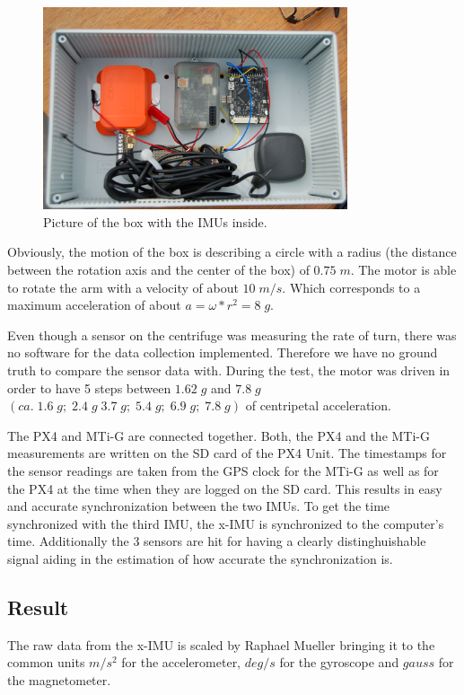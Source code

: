 \begin{figure}[hb]
\begin{center}
\includegraphics[width=0.8\textwidth]{pictures/box.JPG}
\caption{Picture of the box with the IMUs inside.}
\label{box}
\end{center}
\end{figure}
Obviously, the motion of the box is describing a circle with a radius (the distance between the rotation axis and the  center of the box) of $0.75\;m$. The motor is able to rotate the arm with a velocity of about $10\; m/s$. Which corresponds to a maximum acceleration of about $ a=\omega*r^2=8\;g$. 

Even though a sensor on the centrifuge was measuring the rate of turn, there was no software for the data collection implemented. Therefore we have no ground truth to compare the sensor data with. 
During the test, the motor was driven in order to have 5 steps between $1.62\;g$ and $7.8\;g$ $(ca.\;1.6\;g;\;2.4\;g\;3.7\;g;\;5.4\;g;\;6.9\;g;\;7.8\;g)$ of centripetal acceleration.

The PX4 and MTi-G are connected together. Both, the PX4 and the MTi-G measurements are written on the SD card of the PX4 Unit. The timestamps for the sensor readings are taken from the GPS clock for the MTi-G as well as for the PX4 at the time when they are logged on the SD card. This results in easy and accurate synchronization between the two IMUs. To get the time synchronized with the third IMU, the x-IMU is synchronized to the computer's time. Additionally the 3 sensors are hit for having a clearly distinghuishable signal aiding in the estimation of how accurate the synchronization is.
\FloatBarrier
\subsection{Result}
The raw data from the x-IMU is scaled by Raphael Mueller bringing it to the common units $m/s^2$ for the accelerometer, $deg/s$ for the gyroscope and $gauss$ for the magnetometer.

